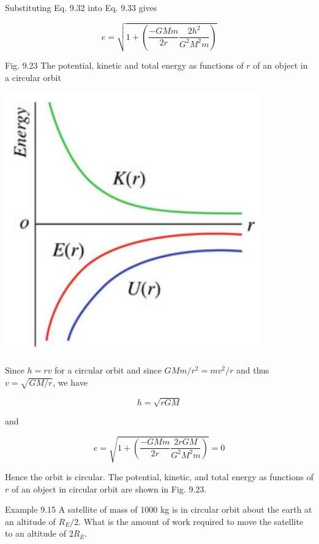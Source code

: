 \documentclass[10pt]{article}
\begin{document}
Substituting Eq. 9.32 into Eq. 9.33 gives

$$
e=\sqrt{1+\left(\frac{-G M m}{2 r} \frac{2 h^{2}}{G^{2} M^{2} m}\right)}
$$

Fig. 9.23 The potential, kinetic and total energy as functions of $r$ of an object in a circular orbit

\begin{center}
\includegraphics[max width=\textwidth]{2024_09_13_db1f357d2aad0a03eb2eg-158}
\end{center}

Since $h=r v$ for a circular orbit and since $G M m / r^{2}=m v^{2} / r$ and thus $v=\sqrt{G M / r}$, we have

$$
h=\sqrt{r G M}
$$

and

$$
e=\sqrt{1+\left(\frac{-G M m}{2 r} \frac{2 r G M}{G^{2} M^{2} m}\right)}=0
$$

Hence the orbit is circular. The potential, kinetic, and total energy as functions of $r$ of an object in circular orbit are shown in Fig. 9.23.

Example 9.15 A satellite of mass of 1000 kg is in circular orbit about the earth at an altitude of $R_{E} / 2$. What is the amount of work required to move the satellite to an altitude of $2 R_{E}$.
\end{document}
